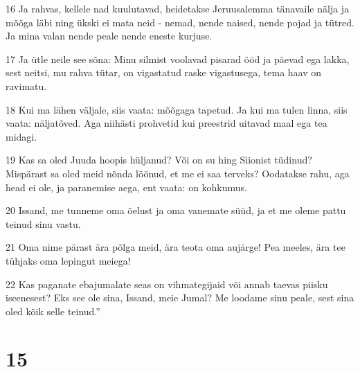 \par 16 Ja rahvas, kellele nad kuulutavad, heidetakse Jeruusalemma tänavaile nälja ja mõõga läbi ning ükski ei mata neid - nemad, nende naised, nende pojad ja tütred. Ja mina valan nende peale nende eneste kurjuse.
\par 17 Ja ütle neile see sõna: Minu silmist voolavad pisarad ööd ja päevad ega lakka, sest neitsi, mu rahva tütar, on vigastatud raske vigastusega, tema haav on ravimatu.
\par 18 Kui ma lähen väljale, siis vaata: mõõgaga tapetud. Ja kui ma tulen linna, siis vaata: näljatõved. Aga niihästi prohvetid kui preestrid uitavad maal ega tea midagi.
\par 19 Kas sa oled Juuda hoopis hüljanud? Või on su hing Siionist tüdinud? Mispärast sa oled meid nõnda löönud, et me ei saa terveks? Oodatakse rahu, aga head ei ole, ja paranemise aega, ent vaata: on kohkumus.
\par 20 Issand, me tunneme oma õelust ja oma vanemate süüd, ja et me oleme pattu teinud sinu vastu.
\par 21 Oma nime pärast ära põlga meid, ära teota oma aujärge! Pea meeles, ära tee tühjaks oma lepingut meiega!
\par 22 Kas paganate ebajumalate seas on vihmategijaid või annab taevas piisku iseenesest? Eks see ole sina, Issand, meie Jumal? Me loodame sinu peale, sest sina oled kõik selle teinud.”

\chapter{15}

